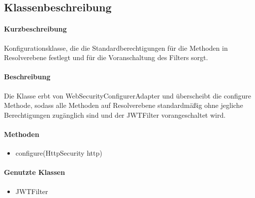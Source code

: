 \subsection{Klassenbeschreibung}%
\paragraph*{Kurzbeschreibung}
Konfigurationsklasse, die die Standardberechtigungen für die Methoden in Resolverebene festlegt und für die Voranschaltung des Filters sorgt.
\paragraph*{Beschreibung}
Die Klasse erbt von \dq WebSecurityConfigurerAdapter \dq und überscheibt die \dq configure \dq Methode, sodass 
alle Methoden auf Resolverebene standardmäßig ohne jegliche Berechtigungen zugänglich sind und der JWTFilter vorangeschaltet wird.
\paragraph*{Methoden}
\begin{itemize}
	\item configure(HttpSecurity http)
\end{itemize}	
\paragraph*{Genutzte Klassen}
\begin{itemize}
	\item JWTFilter
\end{itemize}	
